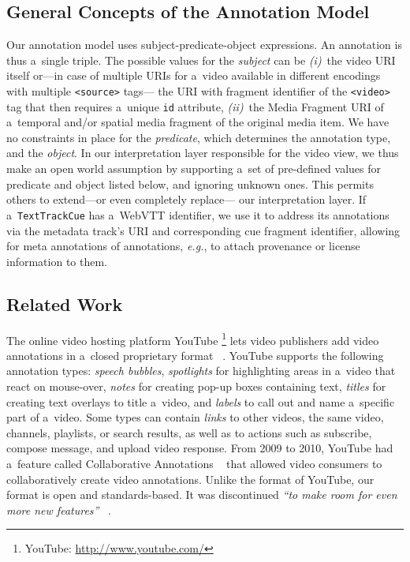\documentclass[runningheads,a4paper]{llncs}
\newcommand{\inlinelistingsize}{\fontsize{8pt}{11pt}}
\let\oldurl\url
\renewcommand{\url}[1]{\inlinelistingsize\oldurl{#1}}
\begin{document}
\subsection{General Concepts of the Annotation Model}

Our annotation model uses subject-predicate-object expressions.
An annotation is thus a~single triple.
The possible values for the \emph{subject} can be \emph{(i)}~the video
URI itself or---in case of multiple URIs for a~video available
in different encodings with multiple \texttt{<source>} tags---%
the URI with fragment identifier of the \texttt{<video>} tag
that then requires a~unique \texttt{id} attribute,
\emph{(ii)}~the Media Fragment URI of a~temporal and/or spatial
media fragment of the original media item.
We have no constraints in place for the \emph{predicate},
which determines the annotation type, and the \emph{object}.
In our interpretation layer responsible for the video view,
we thus make an open world assumption
by supporting a~set of pre-defined values for predicate and object
listed below, and ignoring unknown ones.
This permits others to extend---or even completely replace---%
our interpretation layer.
If a~\texttt{TextTrackCue} has a~WebVTT identifier,
we use it to address its annotations
via the metadata track's URI
and corresponding cue fragment identifier,
allowing for meta annotations of annotations, \emph{e.g.},
to attach provenance or license information to them.

\subsection{Related Work}

The online video hosting platform YouTube%
\footnote{YouTube: \url{http://www.youtube.com/}}
lets video publishers add video annotations
in a~closed proprietary format%
~\cite{youtube2008annotations,youtube2010annotations}.
YouTube supports the following
annotation types: \emph{speech bubbles},
\emph{spotlights} for highlighting areas in a~video
that react on mouse-over,
\emph{notes} for creating pop-up boxes containing text,
\emph{titles} for creating text overlays to title a~video,
and \emph{labels} to call out
and name a~specific part of a~video.
Some types can contain \emph{links}
to other videos, the same video, channels, playlists,
or search results, as well as to actions
such as subscribe, compose message, and upload video response.
From 2009 to 2010, YouTube had a~feature called
Collaborative Annotations%
~\cite{fink2009collaborativeannotations}
that allowed video consumers to collaboratively
create video annotations.
Unlike the format of YouTube, our format is open and standards-based.
It was discontinued \textit{``to make room for even more new features''}%
~\cite{youtube2010annotations}.
\end{document}
